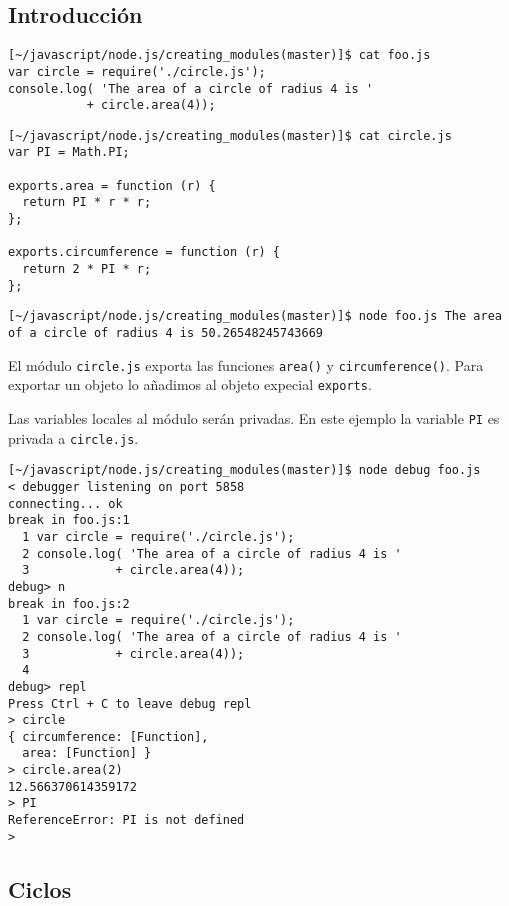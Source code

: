\subsection{Introducción}

\begin{verbatim}
[~/javascript/node.js/creating_modules(master)]$ cat foo.js 
var circle = require('./circle.js');
console.log( 'The area of a circle of radius 4 is '
           + circle.area(4));
\end{verbatim}

\begin{verbatim}
[~/javascript/node.js/creating_modules(master)]$ cat circle.js 
var PI = Math.PI;

exports.area = function (r) {
  return PI * r * r;
};

exports.circumference = function (r) {
  return 2 * PI * r;
};
\end{verbatim}

\begin{verbatim}
[~/javascript/node.js/creating_modules(master)]$ node foo.js The area of a circle of radius 4 is 50.26548245743669
\end{verbatim}

El módulo \verb|circle.js| exporta las funciones \verb|area()| 
y \verb|circumference()|. Para exportar un objeto lo añadimos 
al objeto expecial \verb|exports|.

Las variables locales al módulo serán privadas.
En este ejemplo la variable \verb|PI| es privada a \verb|circle.js|.

\begin{verbatim}
[~/javascript/node.js/creating_modules(master)]$ node debug foo.js 
< debugger listening on port 5858
connecting... ok
break in foo.js:1
  1 var circle = require('./circle.js');
  2 console.log( 'The area of a circle of radius 4 is '
  3            + circle.area(4));
debug> n
break in foo.js:2
  1 var circle = require('./circle.js');
  2 console.log( 'The area of a circle of radius 4 is '
  3            + circle.area(4));
  4 
debug> repl
Press Ctrl + C to leave debug repl
> circle
{ circumference: [Function],
  area: [Function] }
> circle.area(2)
12.566370614359172
> PI
ReferenceError: PI is not defined
> 
\end{verbatim}

\subsection{Ciclos}

